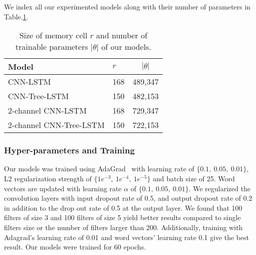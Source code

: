 We index all our experimented models along with their number of parameters in Table.\ref{table:paramtable}.
\begin{table}[H]
	\centering
	\caption{Size of memory cell \(r\) and number of trainable parameters \(\left\vert{\theta}\right\vert\) of our models.
	}
	\label{table:paramtable}
	\begin{tabular}{|l|l|l|}
		\hline
		Model & \(r\) & \multicolumn{1}{|c|}{\(\left\vert{\theta}\right\vert\)}\\ \hline
		CNN-LSTM                 & 168         & 489,347          \\
		CNN-Tree-LSTM            & 150         & 482,153          \\
		2-channel CNN-LSTM       & 168         & 729,347          \\
		2-channel CNN-Tree-LSTM  & 150         &
		722,153 \\
		\hline
	\end{tabular}
\end{table}
\subsubsection{Hyper-parameters and Training}
Our models was trained using AdaGrad~\cite{duchi2011adaptive} with learning rate of $\{0.1,~ 0.05,~ 0.01\}$, L2 regularization strength of $\{1e^{-3},~ 1e^{-4}, ~ 1e^{-5} \}$ and batch size of 25.
Word vectors are updated with learning rate $\alpha$ of $\{0.1,~0.05, ~0.01\}$.
We regularized the convolution layers with input dropout rate of 0.5, and output dropout rate of 0.2 in addition to the drop out rate of 0.5 at the output layer.
We found that 100 filters of size 3 and 100 filters of size 5 yield better results compared to single filters size or the number of filters larger than 200.
Additionally, training with Adagrad's learning rate of 0.01 and word vectors' learning rate 0.1 give the best result.
Our models were trained for 60 epochs.
